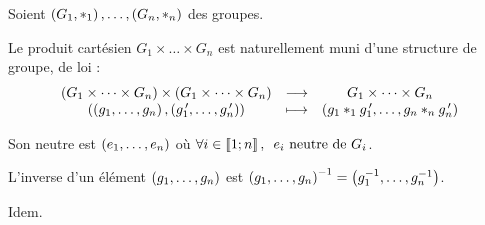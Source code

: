 \begin{ex}
Soient \(\groupe{G_1}[*_1],\dots,\groupe{G_n}[*_n]\) des groupes.

Le produit cartésien \(G_1\times\dots\times G_n\) est naturellement muni d'une structure de groupe, de loi : \[\begin{array}[t]{ccc}\left(G_1\times\dots\times G_n\right)\times\left(G_1\times\dots\times G_n\right) & \longrightarrow & G_1\times\dots\times G_n \\ \left(\left(g_1,\dots,g_n\right),\left(g_1^{\,\prime},\dots,g_n^{\,\prime}\right)\right) & \longmapsto & \left(g_1*_1g_1^{\,\prime},\dots,g_n*_ng_n^{\,\prime}\right)\end{array}\]

Son neutre est \(\left(e_1,\dots,e_n\right)\) où \(\quantifs{\forall i\in\interventierii{1}{n}}e_i\text{ neutre de }G_i\).

L'inverse d'un élément \(\left(g_1,\dots,g_n\right)\) est \(\left(g_1,\dots,g_n\right)^{-1}=\left(g_1^{-1},\dots,g_n^{-1}\right)\).
\end{ex}

\begin{dem}
Idem.
\end{dem}

